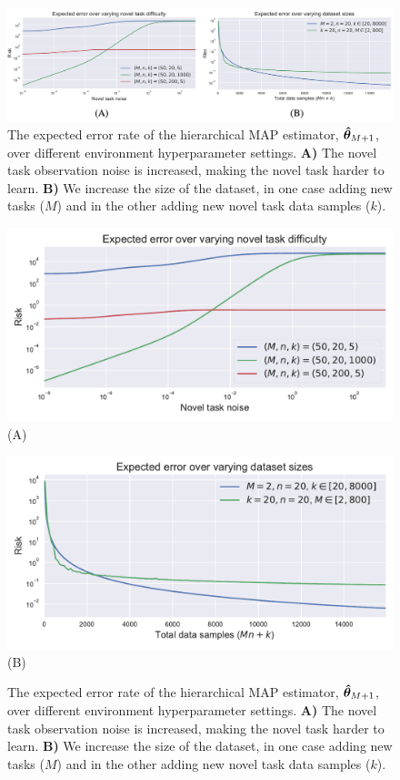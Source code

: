 \iflatexml
\begin{figure}
\includegraphics[width=6\linewidth]{main/images/gaussian.png}
\caption{The expected error rate of the hierarchical MAP estimator, $\bm{\hat{\theta}}_{M+1}$, over different environment
hyperparameter settings. \textbf{A)} The novel task observation noise is increased, making the novel task harder to learn. \textbf{B)} We increase the size of the dataset, in one case adding new tasks ($M$) and in the other adding new novel task data samples ($k$).}
\label{fig:hierarchical_lreg_simulation}
\end{figure}
\else
\begin{figure}
\centering
\begin{minipage}{0.5\linewidth}%
    \centering%
    \includegraphics[width=\linewidth]{main/images/varying_task_difficulty.pdf}
    (A)
\end{minipage}%
\begin{minipage}{0.5\linewidth}%
    \centering%
    \includegraphics[width=\linewidth]{main/images/map_M_plateau.pdf}
    (B)
\end{minipage}
\caption{The expected error rate of the hierarchical MAP estimator, $\bm{\hat{\theta}}_{M+1}$, over different environment
hyperparameter settings. \textbf{A)} The novel task observation noise is increased, making the novel task harder to learn. \textbf{B)} We increase the size of the dataset, in one case adding new tasks ($M$) and in the other adding new novel task data samples ($k$).}
\label{fig:hierarchical_lreg_simulation}
\end{figure}
\fi
